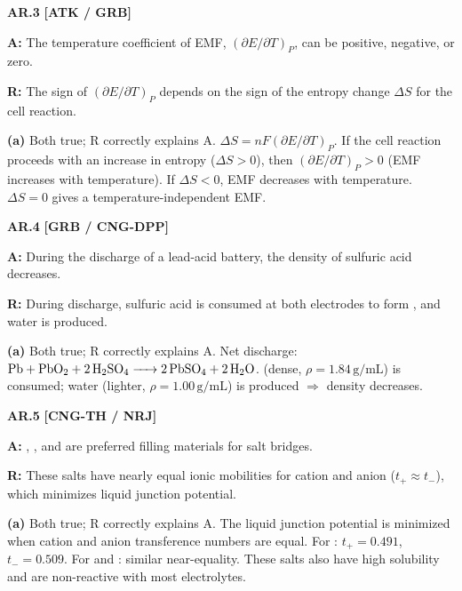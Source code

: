 \begin{problembox}
\textbf{AR.3} \hfill \textbf{[ATK / GRB]}

\textbf{A:} The temperature coefficient of EMF, $(\partial E/\partial T)_P$, can be positive, negative, or zero.

\textbf{R:} The sign of $(\partial E/\partial T)_P$ depends on the sign of the entropy change $\Delta S$ for the cell reaction.
\end{problembox}
\begin{solution}
\textbf{(a)} Both true; R correctly explains A. $\Delta S = nF(\partial E/\partial T)_P$. If the cell reaction proceeds with an increase in entropy ($\Delta S > 0$), then $(\partial E/\partial T)_P > 0$ (EMF increases with temperature). If $\Delta S < 0$, EMF decreases with temperature. $\Delta S = 0$ gives a temperature-independent EMF.
\end{solution}

\begin{problembox}
\textbf{AR.4} \hfill \textbf{[GRB / CNG-DPP]}

\textbf{A:} During the discharge of a lead-acid battery, the density of sulfuric acid decreases.

\textbf{R:} During discharge, sulfuric acid is consumed at both electrodes to form , and water is produced.
\end{problembox}
\begin{solution}
\textbf{(a)} Both true; R correctly explains A. Net discharge: $\ce{Pb + PbO2 + 2H2SO4 -> 2PbSO4 + 2H2O}$.  (dense, $\rho=1.84\,\text{g/mL}$) is consumed; water (lighter, $\rho=1.00\,\text{g/mL}$) is produced $\Rightarrow$ density decreases.
\end{solution}

\begin{problembox}
\textbf{AR.5} \hfill \textbf{[CNG-TH / NRJ]}

\textbf{A:} , , and  are preferred filling materials for salt bridges.

\textbf{R:} These salts have nearly equal ionic mobilities for cation and anion ($t_+ \approx t_-$), which minimizes liquid junction potential.
\end{problembox}
\begin{solution}
\textbf{(a)} Both true; R correctly explains A. The liquid junction potential is minimized when cation and anion transference numbers are equal. For : $t_+ = 0.491$, $t_- = 0.509$. For  and : similar near-equality. These salts also have high solubility and are non-reactive with most electrolytes.
\end{solution}

